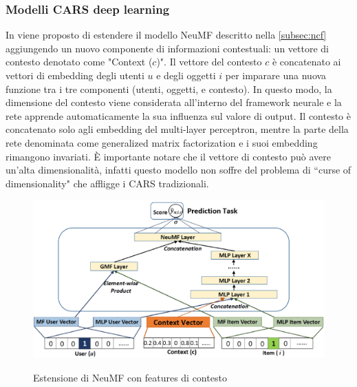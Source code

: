 \documentclass[12pt,italian]{report}
\begin{document}
\subsubsection{Modelli CARS deep learning}
In \cite{context-aware-deep-learning} viene proposto di estendere il modello NeuMF \cite{NCF} descritto nella \autoref{subsec:ncf} aggiungendo un nuovo componente di informazioni contestuali: un vettore di contesto denotato come "Context ($c$)". Il vettore del contesto $c$ è concatenato ai vettori di embedding degli utenti $u$ e degli oggetti $i$ per imparare una nuova funzione tra i tre componenti (utenti, oggetti, e contesto). In questo modo, la dimensione del contesto viene considerata all'interno del framework neurale e la rete apprende automaticamente la sua influenza sul valore di output. Il contesto è concatenato solo agli embedding del multi-layer perceptron, mentre la parte della rete denominata come generalized matrix factorization e i suoi embedding rimangono invariati. \`E importante notare che il vettore di contesto può avere un'alta dimensionalità, infatti questo modello non soffre del problema di ``curse of dimensionality" che affligge i CARS tradizionali.
\begin{figure}
  \centering
  \includegraphics[width=\linewidth]{immagini/cars-ncf.png}
  \caption{Estensione di NeuMF con features di contesto}
  \label{fig:context-neumf}
  \cite{context-aware-deep-learning}
\end{figure}
\end{document}
